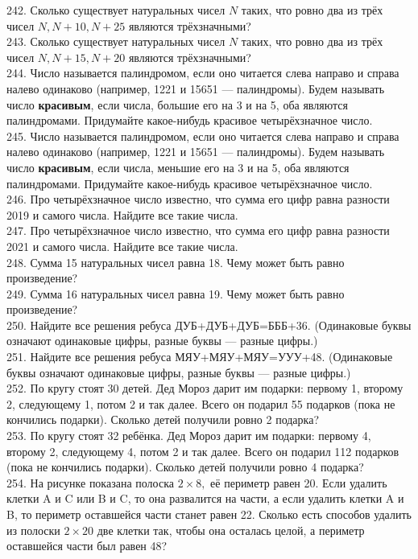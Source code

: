 242. Сколько существует натуральных чисел $N$ таких, что ровно два из трёх чисел $N, N+10, N+25$ являются трёхзначными?\\
243. Сколько существует натуральных чисел $N$ таких, что ровно два из трёх чисел $N, N+15, N+20$ являются трёхзначными?\\
244. Число называется палиндромом, если оно читается слева направо и справа налево одинаково (например, 1221 и 15651 --- палиндромы). Будем называть число {\bf красивым}, если числа, большие его на 3 и на 5, оба являются палиндромами. Придумайте какое-нибудь красивое четырёхзначное число.\\
245. Число называется палиндромом, если оно читается слева направо и справа налево одинаково (например, 1221 и 15651 --- палиндромы). Будем называть число {\bf красивым}, если числа, меньшие его на 3 и на 5, оба являются палиндромами. Придумайте какое-нибудь красивое четырёхзначное число.\\
246. Про четырёхзначное число известно, что сумма его цифр равна разности 2019 и самого числа. Найдите все такие числа.\\
247. Про четырёхзначное число известно, что сумма его цифр равна разности 2021 и самого числа. Найдите все такие числа.\\
248. Сумма 15 натуральных чисел равна 18. Чему может быть равно произведение?\\
249. Сумма 16 натуральных чисел равна 19. Чему может быть равно произведение?\\
250. Найдите все решения ребуса ДУБ+ДУБ+ДУБ=БББ+36. (Одинаковые буквы означают одинаковые цифры, разные буквы --- разные цифры.)\\
251. Найдите все решения ребуса МЯУ+МЯУ+МЯУ=УУУ+48. (Одинаковые буквы означают одинаковые цифры, разные буквы --- разные цифры.)\\
252. По кругу стоят 30 детей. Дед Мороз дарит им подарки: первому 1, второму 2, следующему 1, потом 2 и так далее. Всего он подарил 55 подарков (пока не кончились подарки). Сколько детей получили ровно 2 подарка?\\
253. По кругу стоят 32 ребёнка. Дед Мороз дарит им подарки: первому 4, второму 2, следующему 4, потом 2 и так далее. Всего он подарил 112 подарков (пока не кончились подарки). Сколько детей получили ровно 4 подарка?\\
254. На рисунке показана полоска $2\times 8,$ её периметр равен 20. Если удалить клетки A и C или B и C, то она развалится на части, а если удалить клетки A и B, то периметр оставшейся части станет равен 22. Сколько есть способов удалить из полоски $2\times 20$ две клетки так, чтобы она осталась целой, а периметр оставшейся части был равен 48?

